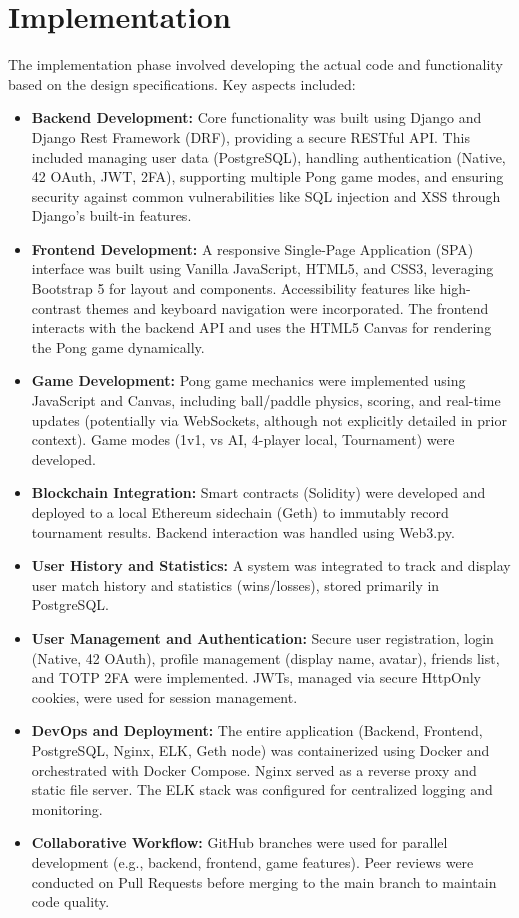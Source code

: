 \section{Implementation}
The implementation phase involved developing the actual code and functionality based on the design specifications. Key aspects included:
\begin{itemize}
    \item \textbf{Backend Development:} Core functionality was built using Django and Django Rest Framework (DRF), providing a secure RESTful API. This included managing user data (PostgreSQL), handling authentication (Native, 42 OAuth, JWT, 2FA), supporting multiple Pong game modes, and ensuring security against common vulnerabilities like SQL injection and XSS through Django's built-in features.
    \item \textbf{Frontend Development:} A responsive Single-Page Application (SPA) interface was built using Vanilla JavaScript, HTML5, and CSS3, leveraging Bootstrap 5 for layout and components. Accessibility features like high-contrast themes and keyboard navigation were incorporated. The frontend interacts with the backend API and uses the HTML5 Canvas for rendering the Pong game dynamically.
    \item \textbf{Game Development:} Pong game mechanics were implemented using JavaScript and Canvas, including ball/paddle physics, scoring, and real-time updates (potentially via WebSockets, although not explicitly detailed in prior context). Game modes (1v1, vs AI, 4-player local, Tournament) were developed.
    \item \textbf{Blockchain Integration:} Smart contracts (Solidity) were developed and deployed to a local Ethereum sidechain (Geth) to immutably record tournament results. Backend interaction was handled using Web3.py.
    \item \textbf{User History and Statistics:} A system was integrated to track and display user match history and statistics (wins/losses), stored primarily in PostgreSQL.
    \item \textbf{User Management and Authentication:} Secure user registration, login (Native, 42 OAuth), profile management (display name, avatar), friends list, and TOTP 2FA were implemented. JWTs, managed via secure HttpOnly cookies, were used for session management.
    \item \textbf{DevOps and Deployment:} The entire application (Backend, Frontend, PostgreSQL, Nginx, ELK, Geth node) was containerized using Docker and orchestrated with Docker Compose. Nginx served as a reverse proxy and static file server. The ELK stack was configured for centralized logging and monitoring.
    \item \textbf{Collaborative Workflow:} GitHub branches were used for parallel development (e.g., backend, frontend, game features). Peer reviews were conducted on Pull Requests before merging to the main branch to maintain code quality.
\end{itemize}

